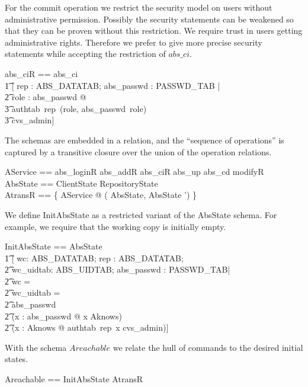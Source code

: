 For the commit operation we restrict the security model on users without
administrative permission. Possibly the security statements can be weakened so
that they can be proven without this restriction. We require trust in users
getting administrative rights. Therefore we prefer to give more precise security
statements while accepting the restriction of $abs\_ci$.
\begin{zed}
%
%
  abs\_ciR == abs\_ci \land \\
  \t1 [ \< rep : ABS\_DATATAB; abs\_passwd : PASSWD\_TAB | \\
  \t2 \forall role : \dom abs\_passwd @ \\
  \t3 authtab~rep~(role, abs\_passwd~role)\\
  \t3 \neq cvs\_admin] \> \\
%
%
\end{zed}
The schemas are embedded in a relation, and the ``sequence of operations'' is
captured by a transitive closure over the union of the operation relations.
\begin{zed}
  AService == abs\_loginR \lor abs\_addR \lor abs\_ciR \lor abs\_up \lor abs\_cd \lor modifyR\\
  AbsState == ClientState \land RepositoryState \\
  AtransR == \{ AService @ ( \theta AbsState, \theta AbsState ') \} \star
\end{zed}
We define InitAbsState as a restricted variant of the AbsState schema. For
example, we require that the working copy is initially empty.
%
%
  \begin{zed}
    InitAbsState == AbsState \land \\
    \t1 [ wc: ABS\_DATATAB; rep : ABS\_DATATAB; \\
    \t2 wc\_uidtab: ABS\_UIDTAB; abs\_passwd : PASSWD\_TAB| \\
    \t2 wc = \emptyset \land \\
    \t2 wc\_uidtab = \emptyset \land \\
    \t2 abs\_passwd \neq \emptyset \land \\
    \t2 (\forall x : abs\_passwd @ x \in Aknows)\land \\
    \t2 (\forall x : Aknows @ authtab~rep~x \neq cvs\_admin)]\\
  \end{zed}  
  With the schema $Areachable$ we relate the hull of commands to the desired
  initial states.
  \begin{zed}
    Areachable == InitAbsState \dres AtransR \\
  \end{zed}
